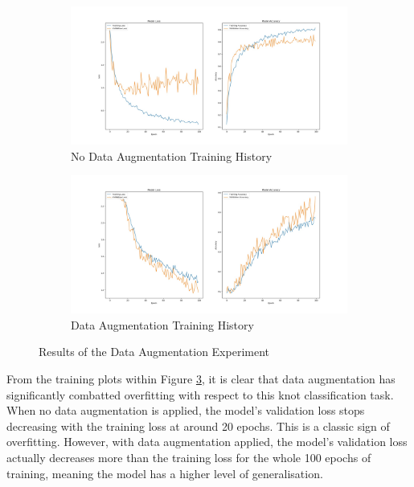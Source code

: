 \documentclass{l4proj}
\begin{document}
\begin{figure}[h]
	\begin{subfigure}{\textwidth}
		\centering
        \includegraphics[width=\linewidth]{eval/noAugtrainingHistory}
        \caption{No Data Augmentation Training History}
        \label{fig:NoAugExperiment}
	\end{subfigure}
	\begin{subfigure}{\textwidth}
		\centering
        \includegraphics[width=\linewidth]{eval/AugtrainingHistory}
        \caption{Data Augmentation Training History}
        \label{fig:AugExperiment}
	\end{subfigure}
	\caption{Results of the Data Augmentation Experiment}
    \label{fig:DataAugmentationExperimentResults}
\end{figure}

From the training plots within Figure \ref{fig:DataAugmentationExperimentResults}, it is clear that data augmentation has significantly combatted overfitting with respect to this knot classification task. When no data augmentation is applied, the model's validation loss stops decreasing with the training loss at around 20 epochs. This is a classic sign of overfitting. However, with data augmentation applied, the model's validation loss actually decreases more than the training loss for the whole 100 epochs of training, meaning the model has a higher level of generalisation. 
\end{document}
